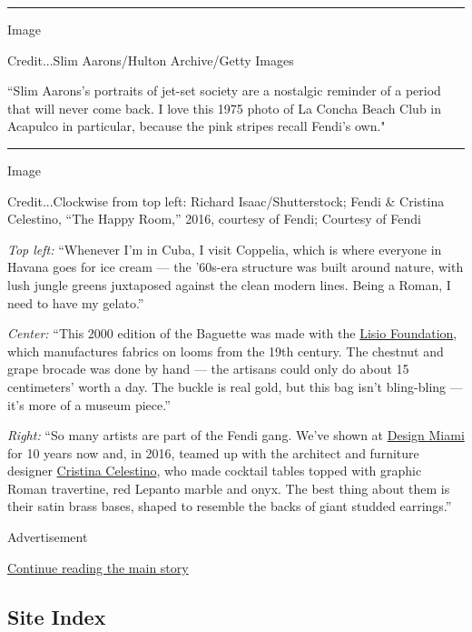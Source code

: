 \begin{center}\rule{0.5\linewidth}{\linethickness}\end{center}

Image

Credit...Slim Aarons/Hulton Archive/Getty Images

``Slim Aarons's portraits of jet-set society are a nostalgic reminder of
a period that will never come back. I love this 1975 photo of La Concha
Beach Club in Acapulco in particular, because the pink stripes recall
Fendi's own."

\begin{center}\rule{0.5\linewidth}{\linethickness}\end{center}

Image

Credit...Clockwise from top left: Richard Isaac/Shutterstock; Fendi \&
Cristina Celestino, ``The Happy Room,'' 2016, courtesy of Fendi;
Courtesy of Fendi

\emph{Top left:} ``Whenever I'm in Cuba, I visit Coppelia, which is
where everyone in Havana goes for ice cream --- the '60s-era structure
was built around nature, with lush jungle greens juxtaposed against the
clean modern lines. Being a Roman, I need to have my gelato.''

\emph{Center:} ``This 2000 edition of the Baguette was made with the
\href{https://www.fondazionelisio.org/en/}{Lisio Foundation}, which
manufactures fabrics on looms from the 19th century. The chestnut and
grape brocade was done by hand --- the artisans could only do about 15
centimeters' worth a day. The buckle is real gold, but this bag isn't
bling-bling --- it's more of a museum piece.''

\emph{Right:} ``So many artists are part of the Fendi gang. We've shown
at
\href{https://www.nytimes.com/2018/12/04/arts/design-miami-2018-art-basel-.html}{Design
Miami} for 10 years now and, in 2016, teamed up with the architect and
furniture designer \href{http://cristinacelestino.com/}{Cristina
Celestino}, who made cocktail tables topped with graphic Roman
travertine, red Lepanto marble and onyx. The best thing about them is
their satin brass bases, shaped to resemble the backs of giant studded
earrings.''

Advertisement

\protect\hyperlink{after-bottom}{Continue reading the main story}

\hypertarget{site-index}{%
\subsection{Site Index}\label{site-index}}

